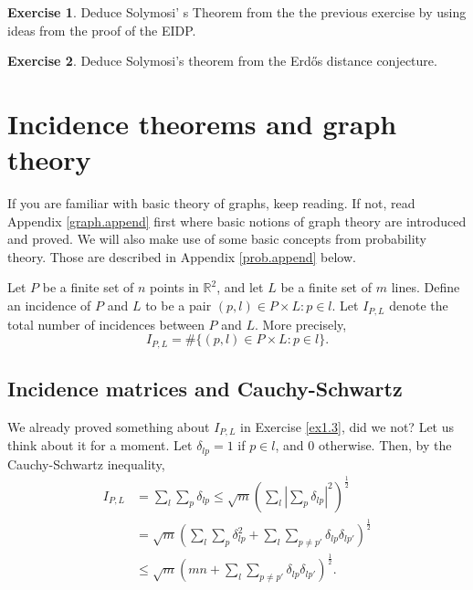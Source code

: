 \documentclass[]{stml-l}
\numberwithin{equation}{chapter}
\theoremstyle{plain}
\theoremstyle{definition}
\newtheorem{exercise}{Exercise}[chapter]
\theoremstyle{remark}
\begin{document}
\begin{exercise} \label{ex2.5}
Deduce Solymosi' s Theorem from the the previous exercise by using ideas from the proof of the EIDP.
\end{exercise}


\begin{exercise} \label{ex2.6}
Deduce Solymosi's theorem from the Erd\H{o}s
distance conjecture. \end{exercise}


\chapter{Incidence theorems and graph theory}


If you are familiar with basic theory of graphs, keep reading. If
not, read Appendix \ref{graph.append} first where basic notions of graph theory are
introduced and proved. We will also make use of some basic
concepts from probability theory. Those are described in Appendix \ref{prob.append}
below.

Let $P$ be a finite set of $n$ points in $\mathbb{R}^2$, and let
$L$ be a finite set of $m$ lines. Define an incidence of $P$ and
$L$ to be a pair $(p,l) \in P \times L: p \in l$. Let $I_{P,L}$ denote
the total number of incidences between $P$ and $L$. More precisely,
\begin{equation}
I_{P,L}=\# \{(p,l) \in P \times L: p \in l\}.
\end{equation}

\section{Incidence matrices and Cauchy-Schwartz}

We already proved something about $I_{P,L}$ in
Exercise \ref{ex1.3}, did
we not? Let us think about it for a moment. Let $\delta_{lp}=1$ if
$p \in l$, and $0$ otherwise. Then, by the Cauchy-Schwartz inequality,
\begin{equation}
\begin{split}
 I_{P,L}&=\sum_l \sum_p \delta_{lp} \leq \sqrt{m} {\left( \sum_l
{\left|\sum_p \delta_{lp} \right|}^2 \right)}^{\frac{1}{2}}\\
&=\sqrt{m} {\left( \sum_l \sum_p \delta^2_{lp}+
\sum_l \sum_{p \not=p'} \delta_{lp}\delta_{lp'} \right)}^{\frac{1}{2}}\\
&\leq \sqrt{m} {\left(mn+\sum_l \sum_{p \not=p'} \delta_{lp}\delta_{lp'}
\right)}^{\frac{1}{2}}.
\end{split}
\end{equation}
\end{document}
